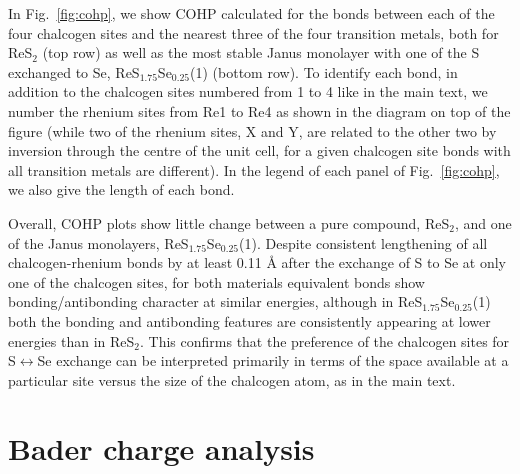 \documentclass[superscriptaddress, amsmath,amssymb, preprint]{revtex4-2}
\begin{document}
In Fig.~\ref{fig:cohp}, we show COHP calculated for the bonds between each of the four chalcogen sites and the nearest three of the four transition metals, both for ReS$_{2}$ (top row) as well as the most stable Janus monolayer with one of the S exchanged to Se, ReS$_{1.75}$Se$_{0.25}$(1) (bottom row). To identify each bond, in addition to the chalcogen sites numbered from 1 to 4 like in the main text, we number the rhenium sites from Re1 to Re4 as shown in the diagram on top of the figure (while two of the rhenium sites, X and Y, are related to the other two by inversion through the centre of the unit cell, for a given chalcogen site bonds with all transition metals are different). In the legend of each panel of Fig.~\ref{fig:cohp}, we also give the length of each bond. 

Overall, COHP plots show little change between a pure compound, ReS$_{2}$, and one of the Janus monolayers, ReS$_{1.75}$Se$_{0.25}$(1). Despite consistent lengthening of all chalcogen-rhenium bonds by at least 0.11 {\AA} after the exchange of S to Se at only one of the chalcogen sites, for both materials equivalent bonds show bonding/antibonding character at similar energies, although in ReS$_{1.75}$Se$_{0.25}$(1) both the bonding and antibonding features are consistently appearing at lower energies than in ReS$_{2}$. This confirms that the preference of the chalcogen sites for S$\leftrightarrow$Se exchange can be interpreted primarily in terms of the space available at a particular site versus the size of the chalcogen atom, as in the main text.

\section{Bader charge analysis}
\end{document}
